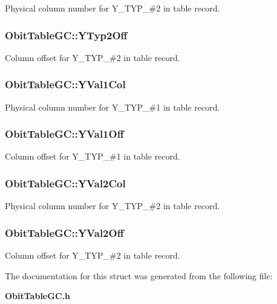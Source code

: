 Physical column number for Y\_\-TYP\_\-\#2 in table record. 

\subsubsection{ {\bf Obit\-Table\-GC::YTyp2Off}}\label{structObitTableGC_o47}


Column offset for Y\_\-TYP\_\-\#2 in table record. 

\subsubsection{ {\bf Obit\-Table\-GC::YVal1Col}}\label{structObitTableGC_o36}


Physical column number for Y\_\-TYP\_\-\#1 in table record. 

\subsubsection{ {\bf Obit\-Table\-GC::YVal1Off}}\label{structObitTableGC_o35}


Column offset for Y\_\-TYP\_\-\#1 in table record. 

\subsubsection{ {\bf Obit\-Table\-GC::YVal2Col}}\label{structObitTableGC_o52}


Physical column number for Y\_\-TYP\_\-\#2 in table record. 

\subsubsection{ {\bf Obit\-Table\-GC::YVal2Off}}\label{structObitTableGC_o51}


Column offset for Y\_\-TYP\_\-\#2 in table record. 



The documentation for this struct was generated from the following file:\begin{CompactItemize}
\item 
{\bf Obit\-Table\-GC.h}\end{CompactItemize}
